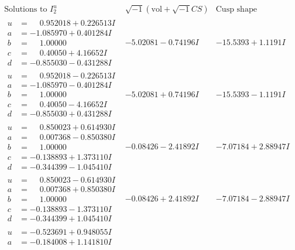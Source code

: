 \documentclass[1p]{elsarticle_modified}
\theoremstyle{definition}
\newcommand{\I}{\sqrt{-1}}
\begin{document}
$$\begin{array}{c|c|c}  
\text{Solutions to }I^u_{2}& \I (\text{vol} + \sqrt{-1}CS) & \text{Cusp shape}\\
 \hline 
\begin{aligned}
u &= \phantom{-}0.952018 + 0.226513 I \\
a &= -1.085970 + 0.401284 I \\
b &= \phantom{-}1.00000\phantom{ +0.000000I} \\
c &= \phantom{-}0.40050 + 4.16652 I \\
d &= -0.855030 - 0.431288 I\end{aligned}
 & -5.02081 - 0.74196 I & -15.5393 + 1.1191 I \\ \hline\begin{aligned}
u &= \phantom{-}0.952018 - 0.226513 I \\
a &= -1.085970 - 0.401284 I \\
b &= \phantom{-}1.00000\phantom{ +0.000000I} \\
c &= \phantom{-}0.40050 - 4.16652 I \\
d &= -0.855030 + 0.431288 I\end{aligned}
 & -5.02081 + 0.74196 I & -15.5393 - 1.1191 I \\ \hline\begin{aligned}
u &= \phantom{-}0.850023 + 0.614930 I \\
a &= \phantom{-}0.007368 - 0.850380 I \\
b &= \phantom{-}1.00000\phantom{ +0.000000I} \\
c &= -0.138893 + 1.373110 I \\
d &= -0.344399 - 1.045410 I\end{aligned}
 & -0.08426 - 2.41892 I & -7.07184 + 2.88947 I \\ \hline\begin{aligned}
u &= \phantom{-}0.850023 - 0.614930 I \\
a &= \phantom{-}0.007368 + 0.850380 I \\
b &= \phantom{-}1.00000\phantom{ +0.000000I} \\
c &= -0.138893 - 1.373110 I \\
d &= -0.344399 + 1.045410 I\end{aligned}
 & -0.08426 + 2.41892 I & -7.07184 - 2.88947 I \\ \hline\begin{aligned}
u &= -0.523691 + 0.948055 I \\
a &= -0.184008 + 1.141810 I \\

\end{aligned}
\end{array}$$
\end{document}
